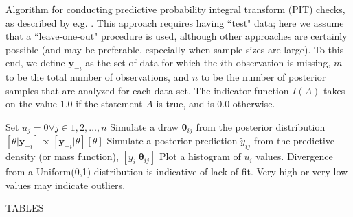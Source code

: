 \documentclass[12pt,english]{article}
\begin{document}
\begin{spacing}{1.9}
\begin{algorithm}
\caption{Algorithm for conducting predictive probability integral transform (PIT) checks, as described by e.g. \citet{Fruiiwirth1996}.  This approach requires having ``test" data; here we assume that a ``leave-one-out" procedure is used, although other  approaches are certainly possible (and may be preferable, especially when sample sizes are large).  To this end, we define $\textbf{y}_{-i}$ as the set of data for which the $i$th observation is missing, $m$ to be the total number of observations, and $n$ to be the number of posterior samples that are analyzed for each data set.  The indicator function $I(A)$ takes on the value 1.0 if the statement $A$ is true, and is 0.0 otherwise.}
\label{alg:pivot}
\begin{algorithmic}
\STATE Set $u_j = 0 \forall j \in 1,2,\hdots,n$
    \STATE Simulate a draw $\boldsymbol{\theta}_{ij}$ from the posterior distribution $[\theta | \textbf{y}_{-i}] \propto [ \textbf{y}_{-i} | \theta][\theta]$
    \STATE Simulate a posterior prediction $\tilde{y}_{ij}$ from the predictive density (or mass function), $[y_i | \boldsymbol{\theta}_{ij}]$
  \ENDFOR
    \ENDIF
    \ENDIF
    \ENDIF
\ENDFOR
\STATE Plot a histogram of $u_i$ values.  Divergence from a Uniform(0,1) distribution is indicative of lack of fit.  Very high or very low values may indicate outliers.
\end{algorithmic}
\end{algorithm}

\pagebreak




TABLES



\end{spacing}
\end{document}
